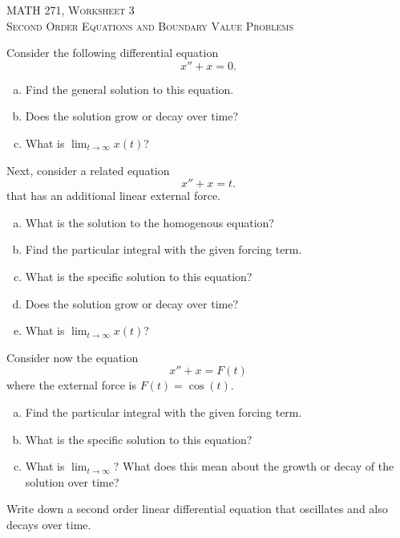 \documentclass[12pt]{article} %
\begin{document}
\begin{center}
   \textsc{\large MATH 271, Worksheet 3}\\
   \textsc{Second Order Equations and Boundary Value Problems}
\end{center}
\vspace{.5cm}

\begin{problem}
Consider the following differential equation
\[
x''+x=0.
\]
\begin{enumerate}[(a)]
    \item Find the general solution to this equation.
    \item Does the solution grow or decay over time? 
    \item What is $\lim_{t\to \infty}x(t)$?
\end{enumerate}

\end{problem}

\begin{problem}
Next, consider a related equation
\[
x''+x=t.
\]
that has an additional linear external force.
\begin{enumerate}[(a)]
    \item What is the solution to the homogenous equation?
    \item Find the particular integral with the given forcing term.
    \item What is the specific solution to this equation?
    \item Does the solution grow or decay over time?
    \item What is $\lim_{t\to \infty}x(t)$?
\end{enumerate}
\end{problem}

\begin{problem}
Consider now the equation
\[
x''+x=F(t)
\]
where the external force is $F(t)=\cos(t)$.
\begin{enumerate}[(a)]
    \item Find the particular integral with the given forcing term.
    \item What is the specific solution to this equation?
    \item What is $\lim_{t\to \infty}$? What does this mean about the growth or decay of the solution over time?
\end{enumerate}
\end{problem}

\begin{problem}
Write down a second order linear differential equation that oscillates and also decays over time.
\end{problem}
\end{document}
